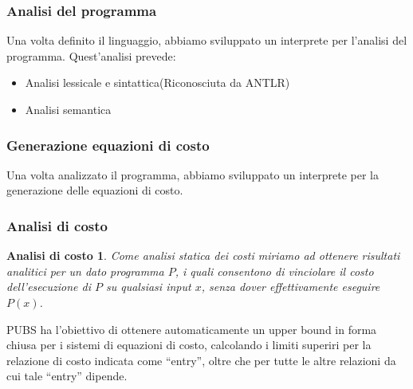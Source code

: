 \documentclass[xcolor=dvipsnames]{beamer}
\begin{document}
\begin{frame}
    \frametitle{Analisi del programma}
    Una volta definito il linguaggio, abbiamo sviluppato un interprete per l'analisi del programma.
    Quest'analisi prevede:
    \begin{itemize}
        \item<1-> Analisi lessicale e sintattica(Riconosciuta da ANTLR)
        \item<2-> Analisi semantica 
    \end{itemize}
\end{frame}

\begin{frame}
    \frametitle{Generazione equazioni di costo}
    Una volta analizzato il programma, abbiamo sviluppato un interprete per la generazione delle equazioni di costo.
\end{frame}

\begin{frame}
    \frametitle{Analisi di costo}
    
    \newtheorem{Analisi di costo}{Analisi di costo}

    \begin{Analisi di costo}
        Come \alert{analisi statica dei costi} miriamo ad ottenere risultati analitici per un dato programma $P$, i quali consentono di vinciolare il costo dell'esecuzione di $P$ su qualsiasi input $x$, senza dover effettivamente eseguire $P(x)$.
    \end{Analisi di costo}
   
    PUBS ha l'obiettivo di ottenere automaticamente un upper bound in forma chiusa per i sistemi di equazioni di costo, calcolando i limiti superiri per la relazione di costo indicata come ``entry'', oltre che per tutte le altre relazioni da cui tale ``entry'' dipende.
\end{frame}
\end{document}

